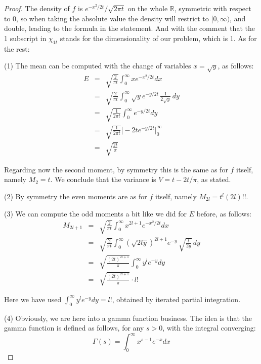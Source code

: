 \documentclass[12pt]{amsbook}
\begin{document}
\begin{proof}
The density of $f$ is $e^{-x^2/2t}/\sqrt{2\pi t}$ on the whole $\mathbb R$, symmetric with respect to 0, so when taking the absolute value the density will restrict to $[0,\infty)$, and double, leading to the formula in the statement. And with the comment that the 1 subscript in $\chi_{1t}$ stands for the dimensionality of our problem, which is 1. As for the rest:

\medskip

(1) The mean can be computed with the change of variables $x=\sqrt{y}$, as follows:
\begin{eqnarray*}
E
&=&\sqrt{\frac{2}{\pi t}}\int_0^\infty xe^{-x^2/2t}dx\\
&=&\sqrt{\frac{2}{\pi t}}\int_0^\infty \sqrt{y}e^{-y/2t}\,\frac{1}{2\sqrt{y}}\,dy\\
&=&\sqrt{\frac{1}{2\pi t}}\int_0^\infty e^{-y/2t}dy\\
&=&\sqrt{\frac{1}{2\pi t}}\Big[-2te^{-y/2t}\Big]_0^\infty\\
&=&\sqrt{\frac{2t}{\pi}}
\end{eqnarray*}

Regarding now the second moment, by symmetry this is the same as for $f$ itself, namely $M_2=t$. We conclude that the variance is $V=t-2t/\pi$, as stated.

\medskip

(2) By symmetry the even moments are as for $f$ itself, namely $M_{2l}=t^l(2l)!!$.

\medskip

(3) We can compute the odd moments a bit like we did for $E$ before, as follows:
\begin{eqnarray*}
M_{2l+1}
&=&\sqrt{\frac{2}{\pi t}}\int_0^\infty x^{2l+1}e^{-x^2/2t}dx\\
&=&\sqrt{\frac{2}{\pi t}}\int_0^\infty(\sqrt{2ty})^{2l+1}e^{-y}\,\sqrt{\frac{t}{2y}}\,dy\\
&=&\sqrt{\frac{(2t)^{2l+1}}{\pi}}\int_0^\infty y^le^{-y}dy\\
&=&\sqrt{\frac{(2t)^{2l+1}}{\pi}}\cdot l!
\end{eqnarray*}

Here we have used $\int_0^\infty y^le^{-y}dy=l!$, obtained by iterated partial integration.

\medskip

(4) Obviously, we are here into a gamma function business. The idea is that the gamma function is defined as follows, for any $s>0$, with the integral converging:
$$\Gamma(s)=\int_0^\infty x^{s-1}e^{-x}dx$$


\end{proof}
\end{document}

